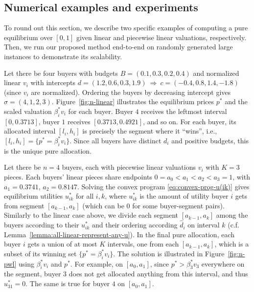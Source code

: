 \subsection{Numerical examples and experiments} \label{subsec:numerical-examples}
To round out this section, we describe two specific examples of computing a pure equilibrium over $[0,1]$ given linear and piecewise linear valuations, respectively. 
Then, we run our proposed method end-to-end on randomly generated large instances to demonstrate its scalability. 

\begin{example}
	[Linear $v_i$]
	\normalfont
	Let there be four buyers with budgets $B = (0.1, 0.3, 0.2, 0.4)$ and normalized linear $v_i$ with intercepts $d = (1.2, 0.6, 0.3, 1.9) \ \Rightarrow \ c = (-0.4,  0.8,  1.4, -1.8)$ (since $v_i$ are normalized). 
	Ordering the buyers by decreasing intercept gives $\sigma = (4, 1, 2, 3)$. 
	Figure~\ref{fig:n-linear} illustrates the equilibrium prices $p^*$ and the scaled valuation $\beta^*_i v_i$ for each buyer. Buyer $4$ receives the leftmost interval $[0, 0.3713]$, buyer $1$ receives $[0.3713, 0.4921]$, and so on. 
	For each buyer, its allocated interval $[l_i,h_i]$ is precisely the segment where it ``wins'', i.e., $[l_i, h_i] = \{p^* = \beta^*_i v_i\}$. 
	Since all buyers have distinct $d_i$ and positive budgets, this is the unique pure allocation. 
	\label{ex:linear-numerical}
\end{example}


\begin{example}
	\normalfont 
	Let there be $n=4$ buyers, each with piecewise linear valuations $v_i$ with $K = 3$ pieces. Each buyers' linear pieces share endpoints $0 = a_0 < a_1 < a_2 < a_3 = 1$, with $a_1 = 0.3741$, $a_2 = 0.8147$. 
	Solving the convex program \eqref{eq:convex-prog-u(ik)} gives equilibrium utilities $u^*_{ik}$ for all $i,k$, where $u^*_{ik}$ is the amount of utility buyer $i$ gets from segment $[a_{k-1}, a_k]$ (which can be $0$ for some buyer-segment pairs). 
	Similarly to the linear case above, we divide each segment  $[a_{k-1}, a_k]$ among the buyers according to their $u^*_{ik}$ and their ordering according $\hat{d}_i$  on interval $k$ (c.f. Lemma~\ref{lemma:all-linear-represent-any-u}).
	In the final pure allocation, each buyer $i$ gets a union of at most $K$ intervals, one from each $[a_{k-1}, a_k]$, which is a subset of its winning set $\{p^* = \beta^*_i v_i\}$. 
	The solution is illustrated in Figure~\ref{fig:n-pwl} using $\beta^*_i v_i$ and $p^*$.
	For example, on $[a_0, a_1]$, since $p^* > \beta^*_3 v_3$ everywhere on the segment, buyer $3$ does not get allocated anything from this interval, and thus $u^*_{31} = 0$. The same is true for buyer $4$ on $[a_0, a_1]$. 
	\label{ex:pwl-numerical}
\end{example}

